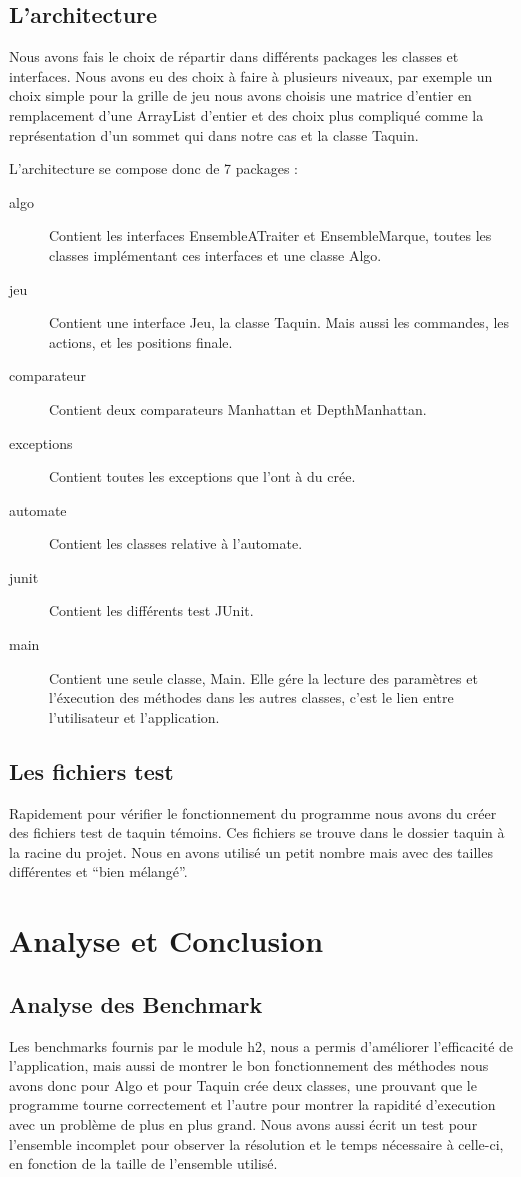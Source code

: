 ﻿\documentclass[a4paper,twoside,12pt]{report}
\begin{document}
\section{L'architecture}
Nous avons fais le choix de répartir dans différents packages les classes et 
interfaces. Nous avons eu des choix à faire à plusieurs niveaux, par
exemple un choix simple pour la grille de jeu nous avons choisis une matrice 
d'entier en remplacement d'une ArrayList d'entier et des choix plus
compliqué comme la représentation d'un sommet qui dans notre cas et la classe 
Taquin.
\par\noindent
L'architecture se compose donc de 7 packages : 
\begin{description}
 \item [algo] Contient les interfaces EnsembleATraiter et EnsembleMarque, toutes 
les classes implémentant ces interfaces et une classe Algo.
 \item [jeu] Contient une interface Jeu, la classe Taquin. Mais aussi les 
commandes, les actions, et les positions finale.
 \item [comparateur] Contient deux comparateurs Manhattan et DepthManhattan.
 \item [exceptions] Contient toutes les exceptions que l'ont à du crée.
 \item [automate] Contient les classes relative à l'automate.
 \item [junit] Contient les différents test JUnit.
 \item [main] Contient une seule classe, Main. Elle gére la lecture des 
paramètres et l'éxecution des méthodes dans les autres classes, c'est
 le lien entre l'utilisateur et l'application.
\end{description}

\section{Les fichiers test}
Rapidement pour vérifier le fonctionnement du programme nous avons du créer des fichiers test de taquin témoins. Ces fichiers se trouve dans le dossier taquin
à la racine du projet. Nous en avons utilisé un petit nombre mais avec des tailles différentes et ``bien mélangé''.
%
\chapter{Analyse et Conclusion}
%
\section{Analyse des Benchmark}
%
Les benchmarks fournis par le module h2, nous a permis d'améliorer l'efficacité de l'application, mais aussi de montrer le bon fonctionnement des méthodes
nous avons donc pour Algo et pour Taquin crée deux classes, une prouvant que le programme tourne correctement et l'autre pour montrer la rapidité d'execution
avec un problème de plus en plus grand. Nous avons aussi écrit un test pour l'ensemble incomplet pour observer la résolution et le temps nécessaire à celle-ci, en
fonction de la taille de l'ensemble utilisé.
%
\end{document}

